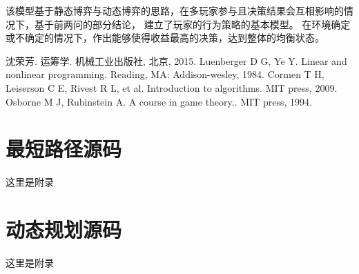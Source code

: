 \documentclass[withoutpreface,bwprint]{cumcmthesis} %
\begin{document}
该模型基于静态博弈与动态博弈的思路，在多玩家参与且决策结果会互相影响的情况下，基于前两问的部分结论，
建立了玩家的行为策略的基本模型。
在环境确定或不确定的情况下，作出能够使得收益最高的决策，达到整体的均衡状态。

\begin{thebibliography}{9}%
    沈荣芳.
    \newblock 运筹学\allowbreak[M].
    \newblock 机械工业出版社, 北京, 2015.
    Luenberger D G, Ye Y.
    \newblock Linear and nonlinear programming\allowbreak[M].
    \newblock Reading, MA: Addison-wesley, 1984.
    Cormen T H, Leiserson C E, Rivest R L, et al.
    \newblock Introduction to algorithms\allowbreak[M].
    \newblock MIT press, 2009.
    Osborne M J, Rubinstein A.  
    \newblock A course in game theory.\allowbreak[M].
    \newblock MIT press, 1994.
\end{thebibliography}






















\newpage

\newpage
\begin{appendices}

\section{最短路径源码}

这里是附录


\newpage


    \section{动态规划源码}
    
    这里是附录
    
\end{appendices}
    
\end{document}

